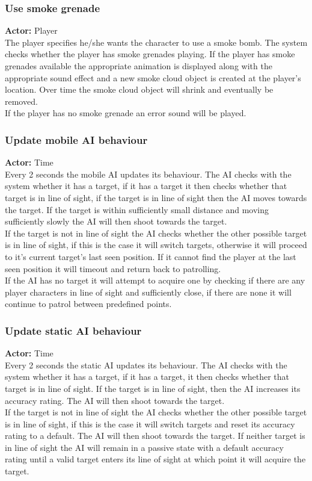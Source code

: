 \documentclass[11pt,a4paper]{article}
\begin{document}
\subsubsection{Use smoke grenade}
\textbf{Actor:} Player\smallskip\\
The player specifies he/she wants the character to use a smoke bomb. The system checks whether the player has smoke grenades playing. If the player has smoke grenades available the appropriate animation is displayed along with the appropriate sound effect and a new smoke cloud object is created at the player's location. Over time the smoke cloud object will shrink and eventually be removed.\smallskip\\
If the player has no smoke grenade an error sound will be played.

\subsubsection{Update mobile AI behaviour}
\textbf{Actor:} Time\smallskip\\
Every 2 seconds the mobile AI updates its behaviour. The AI checks with the system whether it has a target, if it has a target it then checks whether that target is in line of sight, if the target is in line of sight then the AI moves towards the target. If the target is within sufficiently small distance and moving sufficiently slowly the AI will then shoot towards the target.\smallskip\\
If the target is not in line of sight the AI checks whether the other possible target is in line of sight, if this is the case it will switch targets, otherwise it will proceed to it's current target's last seen position. If it cannot find the player at the last seen position it will timeout and return back to patrolling. \smallskip\\
If the AI has no target it will attempt to acquire one by checking if there are any player characters in line of sight and sufficiently close, if there are none it will continue to patrol between predefined points.

\subsubsection{Update static AI behaviour}
\textbf{Actor:} Time\smallskip\\
Every 2 seconds the static AI updates its behaviour. The AI checks with the system whether it has a target, if it has a target, it then checks whether that target is in line of sight. If the target is in line of sight, then the AI increases its accuracy rating. The AI will then shoot towards the target.\smallskip\\
If the target is not in line of sight the AI checks whether the other possible target is in line of sight, if this is the case it will switch targets and reset its accuracy rating to a default. The AI will then shoot towards the target. If neither target is in line of sight the AI will remain in a passive state with a default accuracy rating until a valid target enters its line of sight at which point it will acquire the target.
\end{document}
